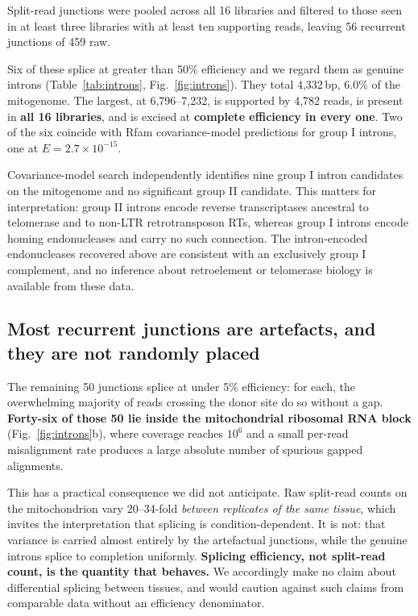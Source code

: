 Split-read junctions were pooled across all 16 libraries and filtered to those seen in at least
three libraries with at least ten supporting reads, leaving 56 recurrent junctions of 459 raw.

Six of these splice at greater than 50\% efficiency and we regard them as genuine introns
(Table~\ref{tab:introns}, Fig.~\ref{fig:introns}). They total 4,332\,bp, 6.0\% of the
mitogenome. The largest, at 6,796--7,232, is supported by 4,782 reads, is present in
\textbf{all 16 libraries}, and is excised at \textbf{complete efficiency in every one}. Two of
the six coincide with Rfam covariance-model predictions for group I introns, one at
$E=2.7\times10^{-15}$.

Covariance-model search independently identifies nine group I intron candidates on the
mitogenome and no significant group II candidate. This matters for interpretation: group II
introns encode reverse transcriptases ancestral to telomerase and to non-LTR retrotransposon
RTs, whereas group I introns encode homing endonucleases and carry no such connection. The
intron-encoded endonucleases recovered above are consistent with an exclusively group I
complement, and no inference about retroelement or telomerase biology is available from these
data.

\subsection{Most recurrent junctions are artefacts, and they are not randomly placed}

The remaining 50 junctions splice at under 5\% efficiency: for each, the overwhelming majority
of reads crossing the donor site do so without a gap. \textbf{Forty-six of those 50 lie inside
the mitochondrial ribosomal RNA block} (Fig.~\ref{fig:introns}b), where coverage reaches
$10^6$ and a small per-read misalignment rate produces a large absolute number of spurious
gapped alignments.

This has a practical consequence we did not anticipate. Raw split-read counts on the
mitochondrion vary 20--34-fold \textit{between replicates of the same tissue}, which invites
the interpretation that splicing is condition-dependent. It is not: that variance is carried
almost entirely by the artefactual junctions, while the genuine introns splice to completion
uniformly. \textbf{Splicing efficiency, not split-read count, is the quantity that behaves.}
We accordingly make no claim about differential splicing between tissues, and would caution
against such claims from comparable data without an efficiency denominator.

